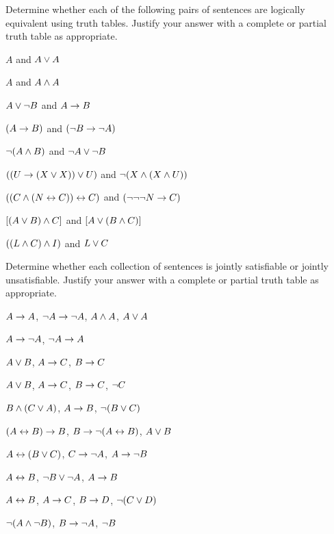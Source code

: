 \noindent\problempart
Determine whether each of the following pairs of sentences are logically equivalent using truth tables. Justify your answer with a complete or partial truth table as appropriate.
\begin{compactlist}
\item $A$ and $A \vee A$
\item $A$ and $A \wedge A$
\item $A \vee \neg B$ and $A\rightarrow B$
\item $(A \rightarrow B)$ and $(\neg B \rightarrow \neg A)$
\item $\neg(A \wedge B)$ and $\neg A \vee \neg B$
\item $ ((U \rightarrow (X \vee X)) \vee U)$ and $\neg (X \wedge (X \wedge U))$
\item $ ((C \wedge (N \leftrightarrow C)) \leftrightarrow C)$ and $(\neg \neg \neg N \rightarrow C)$
\item $[(A \vee B) \wedge C]$ and $[A \vee (B \wedge C)]$
\item $((L \wedge C) \wedge I)$ and $L \vee C$
\end{compactlist}


\noindent\problempart
\label{pr.TT.satisfiable5}
Determine whether each collection of sentences is jointly satisfiable or jointly unsatisfiable. Justify your answer with a complete or partial truth table as appropriate.
\begin{compactlist}
\item $A\rightarrow A$, $\neg A \rightarrow \neg A$, $A\wedge A$, $A\vee A$ \vspace{.5ex} \hfill {}
\item $A \rightarrow \neg A$, $\neg A \rightarrow A$\vspace{.5ex} \hfill {}
\item $A\vee B$, $A\rightarrow C$, $B\rightarrow C$\vspace{.5ex} \hfill {}
\item $A \vee B$, $A \rightarrow C$, $B \rightarrow C$, $\neg C$\vspace{.5ex} \hfill {}
\item $B\wedge(C\vee A)$, $A\rightarrow B$, $\neg(B\vee C)$\vspace{.5ex}  \hfill {}
\item $(A \leftrightarrow B) \rightarrow B$,  $B \rightarrow \neg (A \leftrightarrow B)$, $A \vee B$ \vspace{.5ex} \hfill {}
\item $A\leftrightarrow(B\vee C)$, $C\rightarrow \neg A$, $A\rightarrow \neg B$\vspace{.5ex} \hfill {}
\item  $A \leftrightarrow B$,  $\neg B \vee \neg A$,  $A \rightarrow  B$ \vspace{.5ex} \hfill {}
\item $A \leftrightarrow B$, $A \rightarrow C$, $B \rightarrow D$, $\neg(C \vee D)$\vspace{.5ex} \hfill {}
\item $\neg (A \wedge \neg B)$,  $B \rightarrow \neg A$, $\neg B$  \vspace{.5ex} \hfill {}
\end{compactlist}

